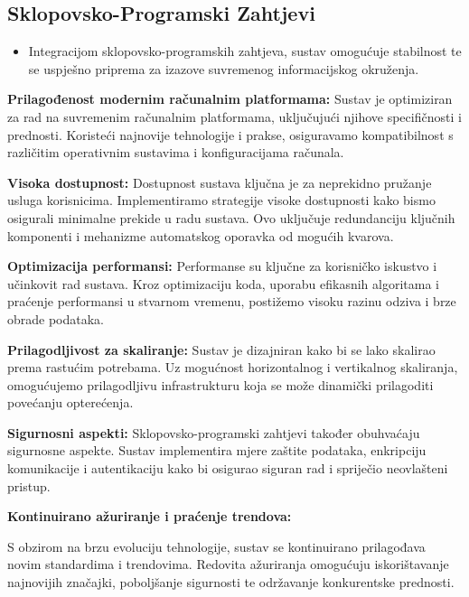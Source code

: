  
\subsection*{Sklopovsko-Programski Zahtjevi}
\begin{itemize}
    \item Integracijom sklopovsko-programskih zahtjeva, sustav omogućuje stabilnost te se uspješno priprema za izazove suvremenog informacijskog okruženja. 
\end{itemize}

\textbf{Prilagođenost modernim računalnim platformama:}
Sustav je optimiziran za rad na suvremenim računalnim platformama, uključujući njihove specifičnosti i prednosti. Koristeći najnovije tehnologije i prakse, osiguravamo kompatibilnost s različitim operativnim sustavima i konfiguracijama računala.\newline

\textbf{Visoka dostupnost:}
Dostupnost sustava ključna je za neprekidno pružanje usluga korisnicima. Implementiramo strategije visoke dostupnosti kako bismo osigurali minimalne prekide u radu sustava. Ovo uključuje redundanciju ključnih komponenti i mehanizme automatskog oporavka od mogućih kvarova.\newline


\textbf{Optimizacija performansi:}
Performanse su ključne za korisničko iskustvo i učinkovit rad sustava. Kroz optimizaciju koda, uporabu efikasnih algoritama i praćenje performansi u stvarnom vremenu, postižemo visoku razinu odziva i brze obrade podataka.\newline


\textbf{Prilagodljivost za skaliranje:}
Sustav je dizajniran kako bi se lako skalirao prema rastućim potrebama. Uz mogućnost horizontalnog i vertikalnog skaliranja, omogućujemo prilagodljivu infrastrukturu koja se može dinamički prilagoditi povećanju opterećenja.\newline

\textbf{Sigurnosni aspekti:}
Sklopovsko-programski zahtjevi također obuhvaćaju sigurnosne aspekte. Sustav implementira mjere zaštite podataka, enkripciju komunikacije i autentikaciju kako bi osigurao siguran rad i spriječio neovlašteni pristup.\newline


\textbf{Kontinuirano ažuriranje i praćenje trendova:}

S obzirom na brzu evoluciju tehnologije, sustav se kontinuirano prilagođava novim standardima i trendovima. Redovita ažuriranja omogućuju iskorištavanje najnovijih značajki, poboljšanje sigurnosti te održavanje konkurentske prednosti.\newline

